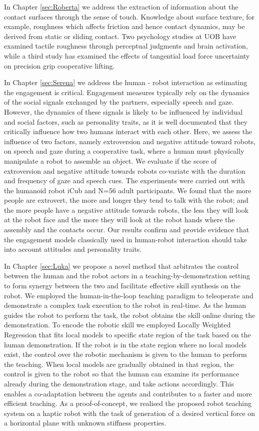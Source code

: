 \documentclass[12pt,a4paper,twoside]{report}
\begin{document}
In Chapter \ref{sec:Roberta} we address the extraction of information about the contact surfaces through the sense of touch. Knowledge about surface texture, for example, roughness which affects friction and hence contact dynamics, may be derived from static or sliding contact. Two psychology studies at UOB have examined tactile roughness through perceptual judgments and brain activation, while a third study has examined the effects of tangential load force uncertainty on precision grip cooperative lifting.
\bigskip

In Chapter \ref{sec:Serena} we address the human - robot interaction as estimating the engagement is critical. Engagement measures typically rely on the dynamics of the social signals exchanged by the partners, especially speech and gaze. However, the dynamics of these signals is likely to be influenced by individual and social factors, such as personality traits, as it is well documented that they critically influence how two humans interact with each other. Here, we assess the influence of two factors, namely extroversion and negative attitude toward robots, on speech and gaze during a cooperative task, where a human must physically manipulate a robot to assemble an object. We evaluate if the score of extroversion and negative attitude towards robots co-variate with the duration and frequency of gaze and speech cues. The experiments were carried out with the humanoid robot iCub and N=56 adult participants. We found that the more people are extrovert, the more and longer they tend to talk with the robot; and the more people have a negative attitude towards robots, the less they will look at the robot face and the more they will look at the robot hands where the assembly and the contacts occur. Our results confirm and provide evidence that the engagement models classically used in human-robot interaction should take into account attitudes and personality traits.
\bigskip

In Chapter \ref{sec:Luka} we propose a novel method that arbitrates the control between the human and the robot actors in a teaching-by-demonstration setting to form synergy between the two and facilitate effective skill synthesis on the robot. We employed the human-in-the-loop teaching paradigm to teleoperate and demonstrate a complex task execution to the robot in real-time. As the human guides the robot to perform the task, the robot obtains the skill online during the demonstration. To encode the robotic skill we employed Locally Weighted Regression that fits local models to specific state region of the task based on the human demonstration. If the robot is in the state region where no local models exist, the control over the robotic mechanism is given to the human to perform the teaching. When local models are gradually obtained in that region, the control is given to the robot so that the human can examine its performance already during the demonstration stage, and take actions accordingly. This enables a co-adaptation between the agents and contributes to a faster and more efficient teaching. As a proof-of-concept, we realised the proposed robot teaching system on a haptic robot with the task of generation of a desired vertical force on a horizontal plane with unknown stiffness properties.
\bigskip
\end{document}

